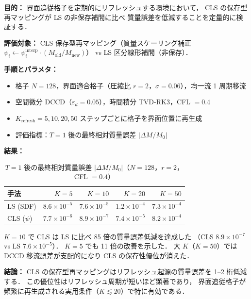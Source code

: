 %

\noindent\textbf{目的：}
界面追従格子を定期的にリフレッシュする環境において，
CLS の保存型再マッピングが LS の非保存補間に比べ
質量誤差を低減することを定量的に検証する．

\noindent\textbf{評価対象：}
CLS 保存型再マッピング（質量スケーリング補正
$\psi_i \leftarrow \psi_i^{\mathrm{interp}} \cdot (M_{\mathrm{old}}/M_{\mathrm{new}})$）
vs LS 区分線形補間（非保存）．

\noindent\textbf{手順とパラメタ：}
\begin{itemize}[noitemsep]
  \item 格子 $N=128$，界面適合格子（圧縮比 $r=2$，$\sigma=0.06$），均一流 1 周期移流
  \item 空間微分 DCCD（$\varepsilon_d = 0.05$），時間積分 TVD-RK3，CFL $=0.4$
  \item $K_{\mathrm{refresh}} = 5, 10, 20, 50$ ステップごとに格子を界面位置に再生成
  \item 評価指標：$T=1$ 後の最終相対質量誤差 $|\Delta M/M_0|$
\end{itemize}

\noindent\textbf{結果：}

\begin{table}[htbp]
  \centering
  \caption{%
    $T=1$ 後の最終相対質量誤差 $|\Delta M/M_0|$（$N=128$，$r=2$，CFL $=0.4$）}
  \label{tab:ls_cls_mass_err}
  \begin{tabular}{lrrrr}
    \toprule
    手法 & $K=5$ & $K=10$ & $K=20$ & $K=50$ \\
    \midrule
    LS (SDF)     & $8.6\times10^{-5}$ & $7.6\times10^{-5}$ & $1.2\times10^{-4}$ & $7.3\times10^{-4}$ \\
    CLS ($\psi$) & $7.7\times10^{-6}$ & $8.9\times10^{-7}$ & $7.4\times10^{-5}$ & $8.2\times10^{-4}$ \\
    \bottomrule
  \end{tabular}
\end{table}

$K=10$ で CLS は LS に比べ 85 倍の質量誤差低減を達成した
（CLS $8.9\times10^{-7}$ vs LS $7.6\times10^{-5}$）．
$K=5$ でも 11 倍の改善を示した．
大 $K$（$K=50$）では DCCD 移流誤差が支配的になり CLS の保存性優位が消えた．

\noindent\textbf{結論：}
CLS の保存型再マッピングはリフレッシュ起源の質量誤差を 1--2 桁低減する．
この優位性はリフレッシュ周期が短いほど顕著であり，
界面追従格子が頻繁に再生成される実用条件（$K \lesssim 20$）で特に有効である．
